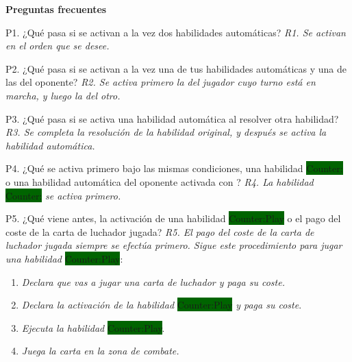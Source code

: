 \documentclass[10pt,a4paper]{article}
\begin{document}
\begin{shaded}
  \textbf{Preguntas frecuentes} \newline

  P1. ¿Qué pasa si se activan a la vez dos habilidades automáticas? \newline
  \emph{R1. Se activan en el orden que se desee.} \newline

  P2. ¿Qué pasa si se activan a la vez una de tus habilidades automáticas y una de las del oponente? \newline
  \emph{R2. Se activa primero la del jugador cuyo turno está en marcha, y luego la del otro.} \newline

  P3. ¿Qué pasa si se activa una habilidad automática al resolver otra habilidad? \newline
  \emph{R3. Se completa la resolución de la habilidad original, y después se activa la habilidad automática.} \newline

  P4. ¿Qué se activa primero bajo las mismas condiciones, una habilidad \colorbox{darkgreen}{\color{white}Counter:} o una habilidad automática del oponente activada con ? \newline
  \emph{R4. La habilidad} \colorbox{darkgreen}{\color{white}Counter:} \emph{se activa primero.} \newline

  P5. ¿Qué viene antes, la activación de una habilidad \colorbox{darkgreen}{\color{white}Counter:Play} o el pago del coste de la carta de luchador jugada? \newline
  \emph{R5. El pago del coste de la carta de luchador jugada siempre se efectúa primero. Sigue este procedimiento para jugar una habilidad} \colorbox{darkgreen}{\color{white}Counter:Play}:
  \begin{enumerate}
  \item \emph{Declara que vas a jugar una carta de luchador y paga su coste.}
  \item \emph{Declara la activación de la habilidad} \colorbox{darkgreen}{\color{white}Counter:Play} \emph{y paga su coste}.
  \item \emph{Ejecuta la habilidad} \colorbox{darkgreen}{\color{white}Counter:Play}.
  \item \emph{Juega la carta en la zona de combate.}
  \end{enumerate}


\end{shaded}
\end{document}
